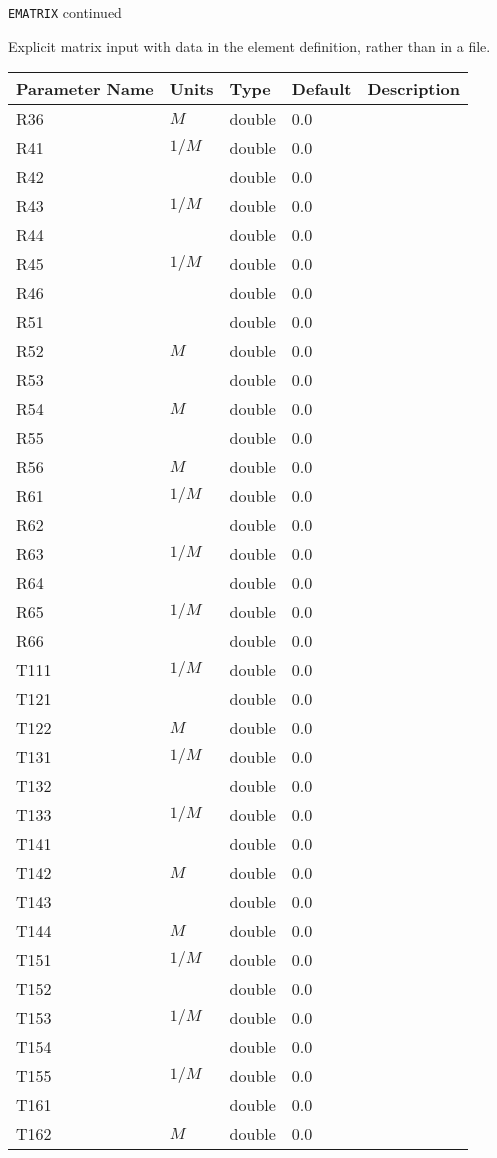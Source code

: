 \newpage
\begin{center}{\Large\verb|EMATRIX| continued}\end{center}
Explicit matrix input with data in the element definition, rather than in a file.
\\
\begin{tabular}{|l|l|l|l|p{\descwidth}|} \hline
Parameter Name & Units & Type & Default & Description \\ \hline 
R36 & $M$ & double &  0.0 & \\ \hline 
R41 & $1/M$ & double &  0.0 & \\ \hline 
R42 &  & double &  0.0 & \\ \hline 
R43 & $1/M$ & double &  0.0 & \\ \hline 
R44 &  & double &  0.0 & \\ \hline 
R45 & $1/M$ & double &  0.0 & \\ \hline 
R46 &  & double &  0.0 & \\ \hline 
R51 &  & double &  0.0 & \\ \hline 
R52 & $M$ & double &  0.0 & \\ \hline 
R53 &  & double &  0.0 & \\ \hline 
R54 & $M$ & double &  0.0 & \\ \hline 
R55 &  & double &  0.0 & \\ \hline 
R56 & $M$ & double &  0.0 & \\ \hline 
R61 & $1/M$ & double &  0.0 & \\ \hline 
R62 &  & double &  0.0 & \\ \hline 
R63 & $1/M$ & double &  0.0 & \\ \hline 
R64 &  & double &  0.0 & \\ \hline 
R65 & $1/M$ & double &  0.0 & \\ \hline 
R66 &  & double &  0.0 & \\ \hline 
T111 & $1/M$ & double &  0.0 & \\ \hline 
T121 &  & double &  0.0 & \\ \hline 
T122 & $M$ & double &  0.0 & \\ \hline 
T131 & $1/M$ & double &  0.0 & \\ \hline 
T132 &  & double &  0.0 & \\ \hline 
T133 & $1/M$ & double &  0.0 & \\ \hline 
T141 &  & double &  0.0 & \\ \hline 
T142 & $M$ & double &  0.0 & \\ \hline 
T143 &  & double &  0.0 & \\ \hline 
T144 & $M$ & double &  0.0 & \\ \hline 
T151 & $1/M$ & double &  0.0 & \\ \hline 
T152 &  & double &  0.0 & \\ \hline 
T153 & $1/M$ & double &  0.0 & \\ \hline 
T154 &  & double &  0.0 & \\ \hline 
T155 & $1/M$ & double &  0.0 & \\ \hline 
T161 &  & double &  0.0 & \\ \hline 
T162 & $M$ & double &  0.0 & \\ \hline 
\end{tabular}

